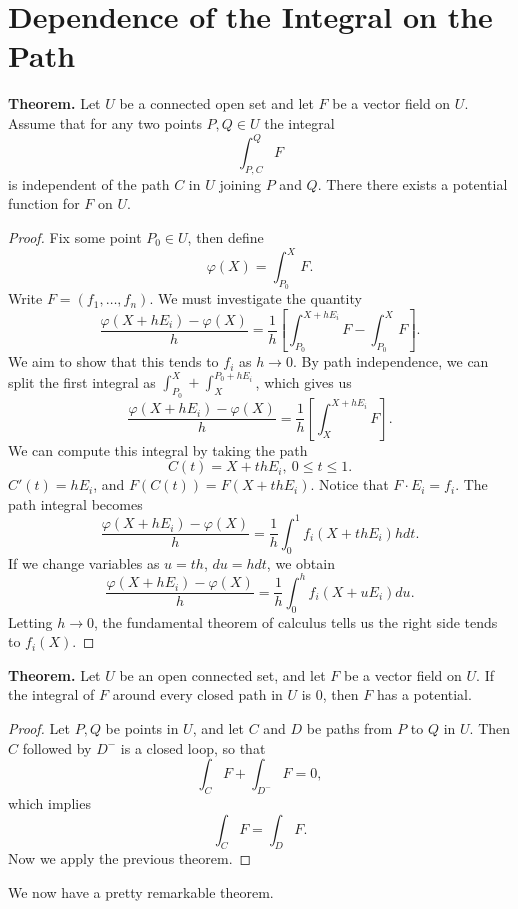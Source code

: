 \documentclass{article}
\begin{document}
\section*{Dependence of the Integral on the Path}

\textbf{Theorem.} Let $U$ be a connected open set and let $F$ be a
vector field on $U$. Assume that for any two points $P,Q \in U$ the integral
\[\int_{P,C}^Q F\]
is independent of the path $C$ in $U$ joining $P$ and $Q$. There there exists
a potential function for $F$ on $U$.
\begin{proof}
    Fix some point $P_0 \in U$, then define
    \[\varphi(X) = \int_{P_0}^X F.\]
    Write $F = (f_1, \ldots, f_n)$. We must investigate the quantity
\[\frac{\varphi(X + h E_i) - \varphi(X)}{h} = \frac{1}{h} \left[ \int_{P_0}^{X+hE_i} F - \int_{P_0}^X F \right].\]
We aim to show that this tends to $f_i$ as $h \to 0$.
By path independence, we can split the first integral as 
$\int_{P_0}^X + \int_X^{P_0 + hE_i}$, which gives us
\[\frac{\varphi(X + h E_i) - \varphi(X)}{h} = \frac{1}{h} \left[ \int_{X}^{X+hE_i} F  \right].\]
We can compute this integral by taking the path 
\[C(t) = X + thE_i,\ 0 \leq t \leq 1.\]
$C'(t) = hE_i$, and $F(C(t)) = F(X + thE_i)$. Notice that $F \cdot E_i = f_i$. The path integral becomes
\[\frac{\varphi(X + h E_i) - \varphi(X)}{h} = \frac{1}{h}\int_0^1 f_i(X+thE_i)hdt.\]
If we change variables as $u=th$, $du = hdt$, we obtain
\[\frac{\varphi(X + h E_i) - \varphi(X)}{h} = \frac{1}{h}\int_0^h f_i(X+uE_i)du.\]
Letting $h \to 0$, the fundamental theorem of calculus tells us the right
side tends to $f_i(X)$. 
\end{proof}

\textbf{Theorem.} Let $U$ be an open connected set, and let $F$ be 
a vector field on $U$. If the integral of $F$ around every closed path
in $U$ is $0$, then $F$ has a potential.
\begin{proof}
    Let $P,Q$ be points in $U$, and let $C$ and $D$ be paths from $P$ to $Q$ in $U$.
    Then $C$ followed by $D^-$ is a closed loop, so that 
    \[\int_C F + \int_{D^-} F = 0,\]
    which implies
    \[\int_C F = \int_D F.\]
    Now we apply the previous theorem.
\end{proof}

We now have a pretty remarkable theorem.
\end{document}
